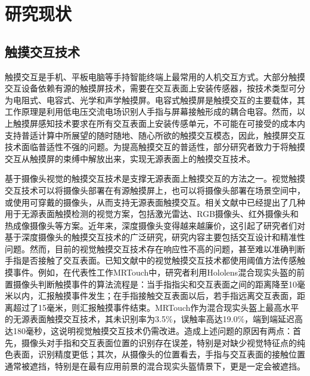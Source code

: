 \section{研究现状}

\subsection{触摸交互技术}

触摸交互是手机、平板电脑等手持智能终端上最常用的人机交互方式。大部分触摸交互设备依赖有源的触摸屏技术，需要在交互表面上安装传感器，按技术类型可分为电阻式\cite{downs2005using, hecht2009carbon}、电容式\cite{lee1985multi, wang2009empirical}、光学\cite{han2005low, matsushita1997holowall, wilson2004touchlight}和声学\cite{paradiso2002passive, xiao2014toffee}触摸屏。电容式触摸屏是触摸交互的主要载体，其工作原理是利用低电压交流电场识别人手指与屏幕接触形成的耦合电容。然而，以上触摸屏感知技术要求在所有交互表面上安装传感单元，不可能在可接受的成本内支持普适计算中所展望的随时随地、随心所欲的触摸交互模态，因此，触摸屏交互技术面临普适性不强的问题。为提高触摸交互的普适性，部分研究者致力于将触摸交互从触摸屏的束缚中解放出来，实现无源表面上的触摸交互技术。


基于摄像头视觉的触摸交互技术是支撑无源表面上触摸交互的方法之一。视觉触摸交互技术可以将摄像头部署在有源触摸屏上\cite{han2005low, matsushita1997holowall,wilson2004touchlight}，也可以将摄像头部署在场景空间中，或使用可穿戴的摄像头\cite{harrison2011omnitouch, xiao2018mrtouch}，从而支持无源表面触摸交互。相关文献中已经提出了几种用于无源表面触摸检测的视觉方案，包括激光雷达\cite{paradiso2000sensor}、RGB摄像头\cite{agarwal2007high, chang2005real, letessier2004visual, sugita2008touch}、红外摄像头\cite{grudin2001integrating}和热成像摄像头\cite{saba2012dante}等方案。近年来，深度摄像头变得越来越廉价，这引起了研究者们对基于深度摄像头的触摸交互技术的广泛研究，研究内容主要包括交互设计\cite{agarwal2007high, xiao2016direct, xiao2018mrtouch}和精准性问题\cite{xiao2018mrtouch, benko2012miragetable, harrison2011omnitouch, wilson2010combining}。然而，目前的视觉触摸交互技术存在响应性不高的问题，甚至难以准确判断手指是否接触了交互表面\cite{xiao2016direct, xiao2018mrtouch}。已知文献中的视觉触摸交互技术都使用阈值方法传感触摸事件\cite{agarwal2007high, wilson2010combining, harrison2011omnitouch, newcombe2011kinectfusion, xiao2016direct, xiao2018mrtouch}。例如，在代表性工作MRTouch\cite{xiao2018mrtouch}中，研究者利用Hololens混合现实头盔的前置摄像头判断触摸事件的算法流程是：当手指指尖和交互表面之间的距离降至10毫米以内，汇报触摸事件发生；在手指接触交互表面以后，若手指远离交互表面，距离超过了15毫米，则汇报触摸事件结束。MRTouch作为混合现实头盔上最高水平的无源表面触摸交互技术，其未识别率为3.5\%，误触率高达19.0\%，端到端延迟高达180毫秒，这说明视觉触摸交互技术仍需改进。造成上述问题的原因有两点：首先，摄像头对手指和交互表面位置的识别存在误差，特别是对缺少视觉特征点的纯色表面，识别精度更低；其次，从摄像头的位置看去，手指与交互表面的接触位置通常被遮挡，特别是在最有应用前景的混合现实头盔情景下，更是一定会被遮挡。

